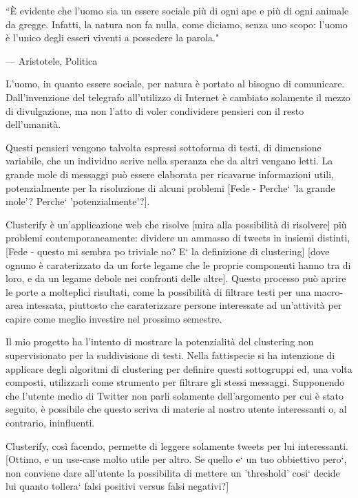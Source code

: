 
\epigraph{``È evidente che l’uomo sia un essere sociale più di ogni ape e più di ogni animale da gregge. Infatti, la natura non fa nulla, come diciamo, senza uno scopo: l’uomo è l’unico degli esseri viventi a possedere la parola."}{--- \textup{Aristotele}, Politica }

L'uomo, in quanto essere sociale, per natura è portato al bisogno di comunicare. Dall'invenzione del telegrafo all'utilizzo di Internet è cambiato solamente il mezzo di divulgazione, ma non l'atto di voler condividere pensieri con il resto dell'umanità.

Questi pensieri vengono talvolta espressi sottoforma di testi, di dimensione variabile, che un individuo scrive nella speranza che da altri vengano letti. La grande mole di messaggi può essere elaborata per ricavarne informazioni utili, potenzialmente per la risoluzione di alcuni problemi [Fede - Perche` 'la grande mole'?  Perche` 'potenzialmente'?].

Clusterify è un'applicazione web che risolve [mira alla possibilità di risolvere] più problemi contemporaneamente: dividere un ammasso di tweets in insiemi distinti, [Fede - questo mi sembra po triviale no?  E` la definizione di clustering] [dove ognuno è caraterizzato da un forte legame che le proprie componenti hanno tra di loro, e da un legame debole nei confronti delle altre]. Questo processo può aprire le porte a molteplici risultati, come la possibilità di filtrare testi per una macro-area intessata, piuttosto che caraterizzare persone interessate ad un'attività per capire come meglio investire nel prossimo semestre.

Il mio progetto ha l'intento di mostrare la potenzialità del clustering non supervisionato per la suddivisione di testi. Nella fattispecie si ha intenzione di applicare degli algoritmi di clustering per definire questi sottogruppi ed, una volta composti, utilizzarli come strumento per filtrare gli stessi messaggi. Supponendo che l'utente medio di Twitter non parli solamente dell'argomento per cui è stato seguito, è possibile che questo scriva di materie al nostro utente interessanti o, al contrario, ininfluenti. 

Clusterify, così facendo, permette di leggere solamente tweets per lui interessanti.  [Ottimo, e un use-case molto utile per altro.  Se quello e` un tuo obbiettivo pero`, non conviene dare all'utente la possibilita di mettere un 'threshold' cosi` decide lui quanto tollera` falsi positivi versus falsi negativi?]